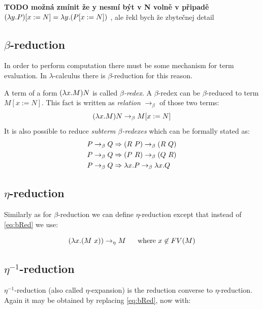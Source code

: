 \documentclass[12pt,a4paper]{report}
\begin{document}
\textbf{TODO možná zmínit že y nesmí být v N volně v připadě\\
$( \lambda y . P )[x:=N] = \lambda y . ( P[x:=N] )$ }, ale řekl bych že zbytečnej detail


\subsection{$\beta$-reduction}

In order to perform computation there must be some
mechanism for term evaluation. In $\lambda$-calculus there
is $\beta$-reduction for this reason.\\

\newcommand{\bRedex}{$\beta$-redex\xspace}
\newcommand{\bRedexes}{$\beta$-redexes\xspace}
\newcommand{\bArrow}{\rightarrow_\beta\xspace}
\newcommand{\eArrow}{\rightarrow_\eta\xspace}
\newcommand{\eeArrow}{\rightarrow_{\eta^{-1}}\xspace}

A term of a form $( \lambda x . M )N$ is called \textit{\bRedex}.
A \bRedex can be $\beta$-reduced to term $M[x:=N]$. 
This fact is written as \textit{relation} $\bArrow$ 
of those two terms:
\begin{equation} \label{eq:bRed}
\lamb{x}{M}N \bArrow M[x:=N]
\end{equation}
It is also possible to reduce \textit{subterm \bRedexes} 
which can be formally stated as:
\begin{align*}
P \bArrow Q &\then (R~P)      \bArrow (R~Q) \\
P \bArrow Q &\then (P~R)      \bArrow (Q~R) \\
P \bArrow Q &\then \lam{x}{P} \bArrow \lam{x}{Q}  
\end{align*}



\subsection{$\eta$-reduction}

Similarly as for $\beta$-reduction we can define $\eta$-reduction 
except that instead of \ref{eq:bRed} we use:  

$$\lamb{x}{(M~x)} \eArrow M \text{ ~~~~where } x \not\in FV(M) $$

\subsection{$\eta^{-1}$-reduction}

$\eta^{-1}$-reduction (also called $\eta$-expansion) is 
the reduction converse to $\eta$-reduction.
Again it may be obtained by replacing \ref{eq:bRed}, now with:  
\end{document}
